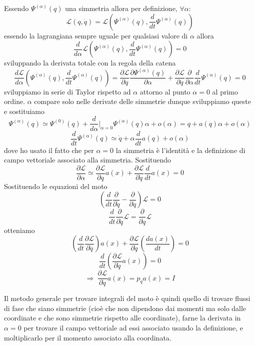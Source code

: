 \documentclass[
10pt, %
a4paper, %
oneside, %
headinclude,footinclude, %
BCOR5mm, %
]{scrartcl}
\begin{document}
\begin{dimostrazione}
	Essendo $\Psi^{(\alpha)}(q)$ una simmetria allora per definizione, \(\forall \alpha\):
	\[\mathcal{L}(q, \dot{q}) = \mathcal{L}(\Psi^{(\alpha)}(q), \frac{d}{dt}\Psi^{(\alpha)}(q))\]
	essendo la lagrangiana sempre uguale per qualsiasi valore di $\alpha$ allora
	\[\frac{d}{d\alpha}\mathcal{L}(\Psi^{(\alpha)}(q), \frac{d}{dt}\Psi^{(\alpha)}(q)) = 0\]
	sviluppando la derivata totale con la regola della catena
	\[\frac{d\mathcal{L}}{d\alpha}(\Psi^{(\alpha)}(q), \frac{d}{dt}\Psi^{(\alpha)}(q)) = \frac{\partial \mathcal{L}}{\partial q}\frac{\partial \Psi^{(\alpha)}(q)}{\partial \alpha}+\frac{\partial \mathcal{L}}{\partial \dot{q}}\frac{\partial}{\partial \alpha}\frac{d}{dt}\Psi^{(\alpha)}(q) = 0\]	
	sviluppiamo in serie di Taylor rispetto ad $\alpha$ attorno al punto $\alpha = 0$ al primo ordine. $\alpha$ compare solo nelle derivate delle simmetrie dunque sviluppiamo queste e sostituiamo
	\[\Psi^{(\alpha)}(q)\simeq \Psi^{(0)}(q) + \frac{d}{d\alpha}|_{\alpha=0}\Psi^{(\alpha)}(q)\alpha+o(\alpha) = q + a(q)\alpha+o(\alpha)\]
	\[\frac{d}{dt}\Psi^{(\alpha)}(q)\simeq \dot{q}+ \alpha \frac{d}{dt}a(q)+o(\alpha)\]
	dove ho usato il fatto che per \(\alpha = 0\) la simmetria è l'identità e la definizione di campo vettoriale associato alla simmetria. Sostituendo
	\[\frac{\partial\mathcal{L}}{\partial \alpha} \simeq \frac{\partial\mathcal{L}}{\partial q}a(x)+\frac{\partial \mathcal{L}}{\partial \dot{q}}\frac{d}{dt}a(x)=0\]	
	Sostituendo le equazioni del moto
	\[\left(\frac{d}{dt}\frac{\partial}{\partial \dot{q}}-\frac{\partial}{\partial q}\right)\mathcal{L} = 0\]
	\[\frac{d}{dt}\frac{\partial}{\partial \dot{q}}\mathcal{L} = \frac{\partial}{\partial q}\mathcal{L}\]
	otteniamo
	\[\left(\frac{d}{dt}\frac{\partial \mathcal{L}}{\partial \dot{q}}\right)a(x)+\frac{\partial \mathcal{L}}{\partial \dot{q}}\left(\frac{da(x)}{dt}\right) = 0\]
	\[\frac{d}{dt}\left(\frac{\partial \mathcal{L}}{\partial \dot{q}}a(x)\right) = 0\]
	\[\Rightarrow\  \frac{\partial \mathcal{L}}{\partial \dot{q}}a(x) = p_q a(x)= I\]
\end{dimostrazione}
\begin{osservazione}
	Il metodo generale per trovare integrali del moto è quindi quello di trovare flussi di fase che siano simmetrie (cioè che non dipendono dai momenti ma solo dalle coordinate e che sono simmetrie rispetto alle coordinate), farne la derivata in \(\alpha = 0\) per trovare il campo vettoriale ad essi associato usando la definizione, e moltiplicarlo per il momento associato alla coordinata.
\end{osservazione}
\end{document}
